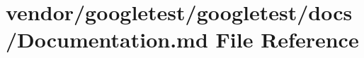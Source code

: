 \hypertarget{googletest_2docs_2Documentation_8md}{}\section{vendor/googletest/googletest/docs/\+Documentation.md File Reference}
\label{googletest_2docs_2Documentation_8md}
